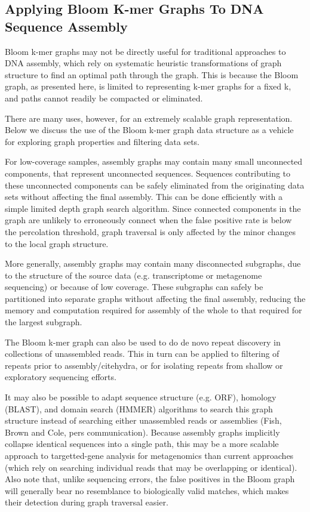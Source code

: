 \documentclass[12pt]{article} \usepackage{simplemargins}
\begin{document}
\subsection{Applying Bloom K-mer Graphs To DNA Sequence Assembly}
Bloom k-mer graphs may not be directly useful for traditional
approaches to DNA assembly, which rely on systematic heuristic
transformations of graph structure to find an optimal path through the
graph.  This is because the Bloom graph, as presented here, is limited
to representing k-mer graphs for a fixed k, and paths cannot readily
be compacted or eliminated.

There are many uses, however, for an extremely scalable
graph representation.  Below we discuss the use of the
Bloom k-mer graph data structure as a vehicle for exploring graph
properties and filtering data sets.

For low-coverage samples, assembly graphs may contain many small
unconnected components, that represent unconnected sequences.
Sequences contributing to these unconnected components can be safely
eliminated from the originating data sets without affecting the final
assembly.  This can be done efficiently with a simple limited depth
graph search algorithm. Since connected components in the graph 
are unlikely to erroneously connect when the false positive rate 
is below the percolation threshold, graph traversal is only affected 
by the minor changes to the local graph structure.

More generally, assembly graphs may contain many disconnected
subgraphs, due to the structure of the source data (e.g. transcriptome
or metagenome sequencing) or because of low coverage.  These subgraphs
can safely be partitioned into separate graphs without affecting the
final assembly, reducing the memory and computation required for
assembly of the whole to that required for the largest subgraph.

The Bloom k-mer graph can also be used to do de novo repeat discovery
in collections of unassembled reads.  This in turn can be applied to
filtering of repeats prior to assembly/cite{hydra}, or for isolating
repeats from shallow or exploratory sequencing efforts.

It may also be possible to adapt sequence structure (e.g. ORF),
homology (BLAST), and domain search (HMMER) algorithms to search this
graph structure instead of searching either unassembled reads or
assemblies (Fish, Brown and Cole, pers communication).  Because 
assembly graphs implicitly collapse identical
sequences into a single path, this may be a more scalable approach to
targetted-gene analysis for metagenomics than current approaches
(which rely on searching individual reads that may be overlapping or identical).  Also note that, unlike
sequencing errors, the false positives in the Bloom graph will
generally bear no resemblance to biologically valid matches, which 
makes their detection during graph traversal easier.
\end{document}
